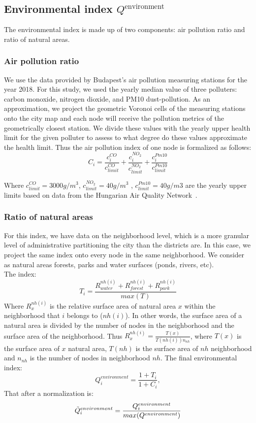 \subsection{Environmental index  \texorpdfstring{$Q^{\text{environment}}$}{Q\^environment}} \label{environment}

The environmental index is made up of two components: air pollution ratio and ratio of natural areas.

\subsubsection{Air pollution ratio}
We use the data provided by Budapest’s air pollution measuring stations for the year 2018. For this study, we used the yearly median value of three polluters: carbon monoxide, nitrogen dioxide, and PM10 dust-pollution.
As an approximation, we project the geometric Voronoi cells of the measuring stations onto the city map and each node will receive the pollution metrics of the geometrically closest station. We divide these values with the yearly upper health limit for the given polluter to assess to what degree do these values approximate the health limit. Thus the air pollution index of one node is formalized as follows:
$$C_i=\frac{c_i^{CO}}{c_{limit}^{CO}}+\frac{c_i^{NO_2}}{c_{limit}^{NO_2}}+\frac{c_i^{Pm10}}{c_{limit}^{Pm10}}$$

Where $c^{CO}_{limit}=3000 g/m^3$, $c^{NO_2}_{limit}=40 g/m^3$ , $c^{Pm10}_{limit}=40 g/m3$ are the yearly upper limits based on data from the Hungarian Air Quality Network~\cite{HU2019Pollution}.

\subsubsection{Ratio of natural areas}
For this index, we have data on the neighborhood level, which is a more granular level of administrative partitioning the city than the districts are. In this case, we project the same index onto every node in the same neighborhood. We consider as natural areas forests, parks and water surfaces (ponds, rivers, etc). \\
The index:
$$T_i=\frac{R_{water}^{nh(i)}+ R_{forest}^{nh(i)}+R_{park}^{nh(i)}}{max(T)}$$
Where $R_x^{nh(i)}$ is the relative surface area of natural area $x$ within the neighborhood that $i$ belongs to ($nh(i)$). In other words, the surface area of a natural area is divided by the number of nodes in the neighborhood and the surface area of the neighborhood. Thus
$R_x^{nh(i)}=\frac{T(x)}{T(nh(i))n_{nh}}$, where $T(x)$ is the surface area of $x$ natural area, $T(nh)$ is the surface area of $nh$ neighborhood and $n_{nh}$ is the number of nodes in neighborhood $nh$.
The final environmental index:
$$Q_i^{environment}=\frac{1+T_i}{1+C_i},$$
That after a normalization is:
$$\Tilde{Q}_i^{environment}=\frac{Q_i^{environment}}{max(Q^{environment})}$$


